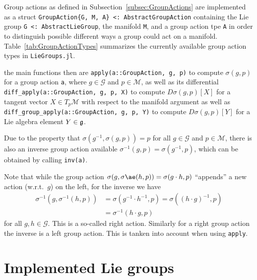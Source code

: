 \documentclass{juliacon}
\begin{document}
Group actions as defined in Subsection~\ref{subsec:GroupActions} are implemented as a struct \verb|GroupAction{G, M, A} <: AbstractGroupAction| containing the Lie group \verb|G <: AbstractLieGroup|, the manifold \verb|M|, and a group action tpe \verb|A| in order to distinguish possible different ways a group could act on a manifold.
Table~\ref{tab:GroupActionTypes} summarizes the currently available group action types in \verb|LieGroups.jl|.

the main functions then are \verb|apply(a::GroupAction, g, p)|
to compute \(\sigma(g, p)\) for a group action \verb|a|, where $g\in \mathcal G$ and $p \in \mathcal M$, as well as its differential \verb|diff_apply(a::GroupAction, g, p, X)|
to compute \(D\sigma(g, p)[X]\) for a tangent vector \(X \in T_p\mathcal M\) with respect to the manifold argument as well as \verb|diff_group_apply(a::GroupAction, g, p, Y)|
to compute \(D\sigma(g, p)[Y]\) for a Lie algebra element \(Y \in \frak g\).

Due to the property that \(\sigma(g^{-1}, \sigma(g, p)) = p\) for all \(g \in \mathcal{G}\) and \(p \in \mathcal{M}\), there is also an inverse group action available $\sigma^{-1}(g, p) = \sigma(g^{-1}, p)$, which can be obtained by calling \verb|inv(a)|.

Note that while the group action $\sigma(g, \sigmaæ(h, p)) = \sigma(g \cdot h, p)$ “appends” a new action (w.r.t.~$g$) on the left, for the inverse we have
\begin{align*}
        \sigma^{-1}(g, \sigma^{-1}(h, p))
        &= \sigma(g^{-1}\cdot h^{-1}, p)
        = \sigma((h \cdot g)^{-1}, p)
        \\
        &= \sigma^{-1}(h \cdot g, p)
\end{align*}
for all \(g, h \in \mathcal{G}\). This is a so-called right action.
Similarly for a right group action the inverse is a left group action.
This is tanken into account when using \verb|apply|.

\section{Implemented Lie groups}\label{sec:LieGroups}
\end{document}
